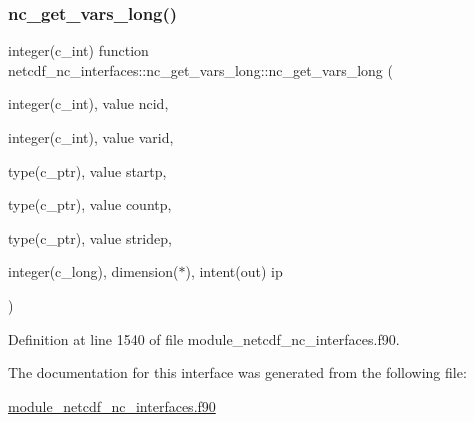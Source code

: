 \subsubsection{\texorpdfstring{nc\+\_\+get\+\_\+vars\+\_\+long()}{nc\_get\_vars\_long()}}
{\footnotesize\ttfamily integer(c\+\_\+int) function netcdf\+\_\+nc\+\_\+interfaces\+::nc\+\_\+get\+\_\+vars\+\_\+long\+::nc\+\_\+get\+\_\+vars\+\_\+long (\begin{DoxyParamCaption}\item[{integer(c\+\_\+int), value}]{ncid,  }\item[{integer(c\+\_\+int), value}]{varid,  }\item[{type(c\+\_\+ptr), value}]{startp,  }\item[{type(c\+\_\+ptr), value}]{countp,  }\item[{type(c\+\_\+ptr), value}]{stridep,  }\item[{integer(c\+\_\+long), dimension($\ast$), intent(out)}]{ip }\end{DoxyParamCaption})}



Definition at line 1540 of file module\+\_\+netcdf\+\_\+nc\+\_\+interfaces.\+f90.



The documentation for this interface was generated from the following file\+:\begin{DoxyCompactItemize}
\item 
\hyperlink{module__netcdf__nc__interfaces_8f90}{module\+\_\+netcdf\+\_\+nc\+\_\+interfaces.\+f90}\end{DoxyCompactItemize}
